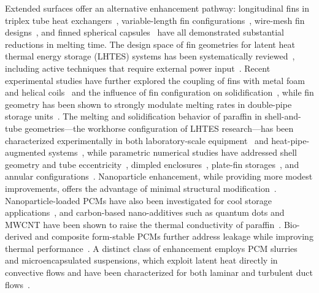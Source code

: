 Extended surfaces offer an alternative enhancement pathway: longitudinal fins in triplex tube heat exchangers~\cite{patel2018thermal,alabidi2013internal}, variable-length fin configurations~\cite{temel2023experimental}, wire-mesh fin designs~\cite{uniyal2024melting}, and finned spherical capsules~\cite{sharma2022effect} have all demonstrated substantial reductions in melting time. The design space of fin geometries for latent heat thermal energy storage (LHTES) systems has been systematically reviewed~\cite{abdullhussein2025review,srivastava2026advanced}, including active techniques that require external power input~\cite{shank2023review}. Recent experimental studies have further explored the coupling of fins with metal foam and helical coils~\cite{tahmasbi2024effects} and the influence of fin configuration on solidification~\cite{fatlawi2024numerical,rao2022thermal}, while fin geometry has been shown to strongly modulate melting rates in double-pipe storage units~\cite{elsayed2025influence}. The melting and solidification behavior of paraffin in shell-and-tube geometries---the workhorse configuration of LHTES research---has been characterized experimentally in both laboratory-scale equipment~\cite{trp2005experimental,gasia2016experimental,ashokkumar2022experimental} and heat-pipe-augmented systems~\cite{motahar2016experimental}, while parametric numerical studies have addressed shell geometry and tube eccentricity~\cite{parsakamkari2024experimental}, dimpled enclosures~\cite{soliman2021melting,soliman2021numerical}, plate-fin storages~\cite{lv2008numerical}, and annular configurations~\cite{kothari2018comprehensive}.
Nanoparticle enhancement, while providing more modest improvements, offers the advantage of minimal structural modification~\cite{murugan2017thermal,bora2026enhanced,bashirpour2021investigation,yadav2020nanoparticle,rudrabhiramu2026nanoparticle,manojkumar2020experimental,farahani2021efficacy}. Nanoparticle-loaded PCMs have also been investigated for cool storage applications~\cite{almeshaal2023numerical}, and carbon-based nano-additives such as quantum dots and MWCNT have been shown to raise the thermal conductivity of paraffin~\cite{emeema2024investigations,sathishkumar2023investigations,george2020novel}. Bio-derived and composite form-stable PCMs further address leakage while improving thermal performance~\cite{yadav2024experimental,gogoi2024thermal}. A distinct class of enhancement employs PCM slurries and microencapsulated suspensions, which exploit latent heat directly in convective flows and have been characterized for both laminar and turbulent duct flows~\cite{charunyakorn1991forced,choi1994forced,alisetti2000forced,inaba2004melting,zhang2003theoretical,delgado2012review}.

